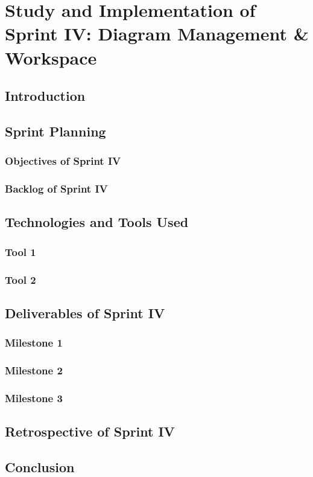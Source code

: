 \documentclass[a4paper,12pt]{report}
\begin{document}
\chapter{Study and Implementation of Sprint IV: Diagram Management \& Workspace}

\section{Introduction}
\section{Sprint Planning}
\subsection{Objectives of Sprint IV}
\subsection{Backlog of Sprint IV}
\section{Technologies and Tools Used}
\subsection{Tool 1}
\subsection{Tool 2}
\section{Deliverables of Sprint IV}
\subsection{Milestone 1}
\subsection{Milestone 2}
\subsection{Milestone 3}
\section{Retrospective of Sprint IV}
\section{Conclusion}
\end{document}
